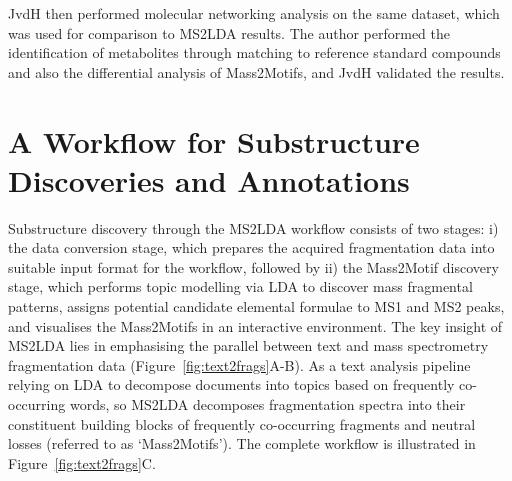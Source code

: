 JvdH then performed molecular networking analysis on the same dataset, which was used for comparison to MS2LDA results. The author performed the identification of metabolites through matching to reference standard compounds and also the differential analysis of Mass2Motifs, and JvdH validated the results. 

\section{A Workflow for Substructure Discoveries and Annotations\label{sub:ms2lda-workflow}}

Substructure discovery through the MS2LDA workflow consists of two stages: i) the data conversion stage, which prepares the acquired fragmentation data into suitable input format for the workflow, followed by ii) the Mass2Motif discovery stage, which performs topic modelling via LDA to discover mass fragmental patterns, assigns potential candidate elemental formulae to MS1 and MS2 peaks, and visualises the Mass2Motifs in an interactive environment. The key insight of MS2LDA lies in emphasising the parallel between text and mass spectrometry fragmentation data (Figure~\ref{fig:text2frags}A-B). As a text analysis pipeline relying on LDA to decompose documents into topics based on frequently co-occurring words, so MS2LDA decomposes fragmentation spectra into their constituent building blocks of frequently co-occurring fragments and neutral losses (referred to as ‘Mass2Motifs’). The complete workflow is illustrated in Figure~\ref{fig:text2frags}C. 

